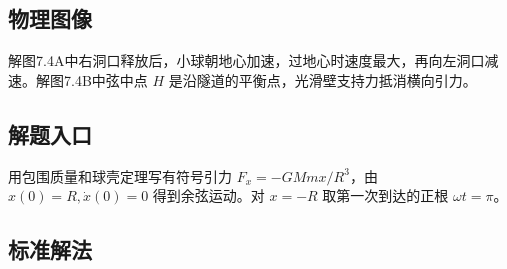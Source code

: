 \documentclass[UTF8,fontset=fandol,a4paper,11pt]{ctexart}
\begin{document}


\subsection*{物理图像}

解图7.4A中右洞口释放后，小球朝地心加速，过地心时速度最大，再向左洞口减速。解图7.4B中弦中点 $H$ 是沿隧道的平衡点，光滑壁支持力抵消横向引力。




\subsection*{解题入口}

用包围质量和球壳定理写有符号引力 $F_x=-GMmx/R^3$，由 $x(0)=R,\dot x(0)=0$ 得到余弦运动。对 $x=-R$ 取第一次到达的正根 $\omega t=\pi$。



\subsection*{标准解法}
\end{document}
